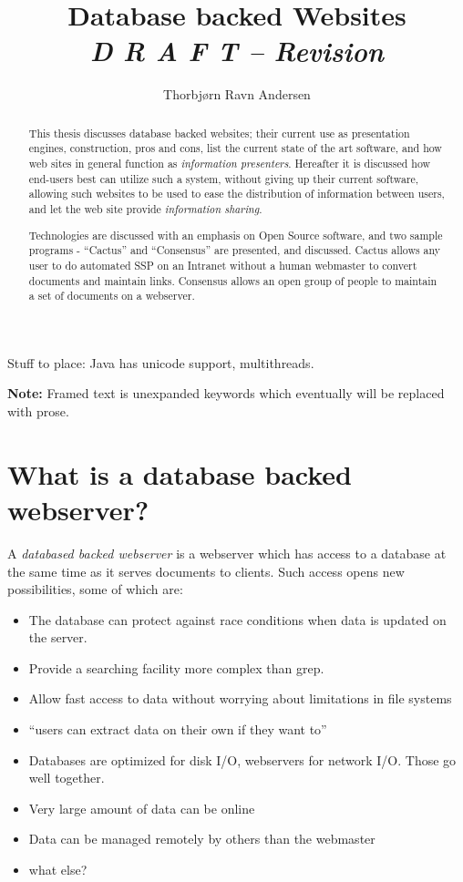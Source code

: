\documentclass[draft,a4paper]{article}
\author{ Thorbj{\o}rn Ravn Andersen}
\title{Database backed Websites \\
  \textit{D R A F T -- $ $Revision$ $}} %
\begin{document}
\maketitle

\begin{abstract}
  This thesis discusses database backed websites; their current use as
  presentation engines, construction, pros and cons, list the current
  state of the art software, and how web sites in general function as
  \textit{information presenters}.  Hereafter it is discussed how
  end-users best can utilize such a system, without giving up their
  current software, allowing such websites to be used to ease the
  distribution of information between users, and let the web site
  provide \textit{information sharing}.
  
  Technologies are discussed with an emphasis on Open Source software,
  and two sample programs - ``Cactus'' and ``Consensus'' are
  presented,  and discussed.  Cactus allows any user to do automated
  SSP on an Intranet without a human webmaster to convert documents
  and maintain links.  Consensus allows an open group of people to
  maintain a set of documents on a webserver.
  
\end{abstract}
Stuff to place:  Java has unicode support, multithreads.


\textbf{Note: }Framed text is unexpanded keywords which eventually
will be replaced with prose.

\section{What is a database backed webserver?}

A \textit{databased backed webserver} is a webserver which has access
to a database at the same time as it serves documents to clients.
Such access opens new possibilities, some of which are:

\begin{itemize}
\item The database can protect against race conditions when data is
  updated on the server.
\item Provide a searching facility more complex than grep.
\item Allow fast access to data without worrying about limitations in
  file systems
\item ``\textsf{users can extract data on their own if they want to}''
\item Databases are optimized for disk I/O, webservers for network
  I/O.  Those go well together.
\item Very large amount of data can be online
\item Data can be managed remotely by others than the webmaster
\item \textsf{what else?}
\end{itemize}
\end{document}
